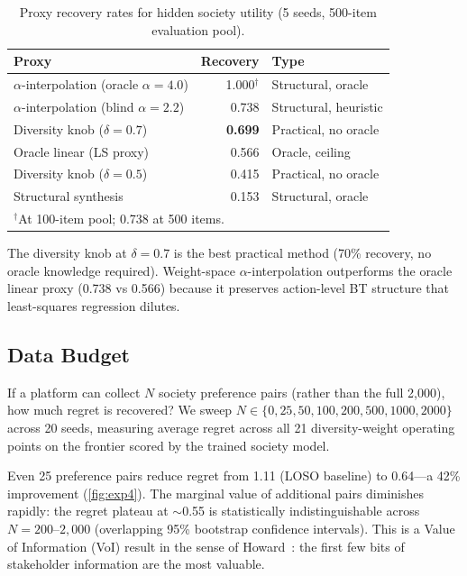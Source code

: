 \documentclass[11pt,letterpaper]{article}
\begin{document}
\begin{table}[t]
  \caption{Proxy recovery rates for hidden society utility (5 seeds,
    500-item evaluation pool).}
  \label{tab:proxy}
  \centering\small
  \begin{tabular}{lrl}
    \toprule
    \textbf{Proxy} & \textbf{Recovery} & \textbf{Type} \\
    \midrule
    $\alpha$-interpolation (oracle $\alpha = 4.0$) & 1.000$^\dagger$ & Structural, oracle \\
    $\alpha$-interpolation (blind $\alpha = 2.2$) & 0.738 & Structural, heuristic \\
    Diversity knob ($\delta = 0.7$) & \textbf{0.699} & Practical, no oracle \\
    Oracle linear (LS proxy) & 0.566 & Oracle, ceiling \\
    Diversity knob ($\delta = 0.5$) & 0.415 & Practical, no oracle \\
    Structural synthesis & 0.153 & Structural, oracle \\
    \bottomrule
    \multicolumn{3}{l}{\footnotesize $^\dagger$At 100-item pool; 0.738 at 500 items.}
  \end{tabular}
\end{table}

The diversity knob at $\delta = 0.7$ is the best practical method
(70\% recovery, no oracle knowledge required). Weight-space
$\alpha$-interpolation outperforms the oracle linear proxy (0.738 vs
0.566) because it preserves action-level BT structure that
least-squares regression dilutes.

\subsection{Data Budget}
\label{sec:databudget}

If a platform can collect $N$ society preference pairs (rather than
the full 2{,}000), how much regret is recovered? We sweep $N \in
\{0, 25, 50, 100, 200, 500, 1000, 2000\}$ across 20 seeds,
measuring average regret across all 21 diversity-weight operating
points on the frontier scored by the trained society model.

Even 25 preference pairs reduce regret from 1.11 (LOSO baseline) to
0.64---a 42\% improvement (\cref{fig:exp4}). The marginal value of additional pairs
diminishes rapidly: the regret plateau at $\sim$0.55 is statistically
indistinguishable across $N = 200$--$2{,}000$ (overlapping 95\%
bootstrap confidence intervals). This is a Value of Information
(VoI) result in the sense of Howard~\cite{howard1966information}:
the first few bits of stakeholder information are the most valuable.
\end{document}
